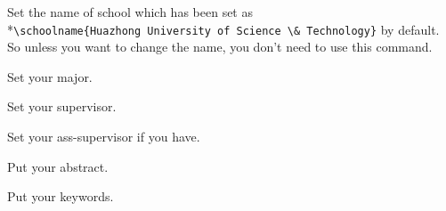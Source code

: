 \documentclass[12pt,a4paper,numbered,full]{l3doc}
\begin{document}
\begin{function}{\schoolname}
    \begin{syntax}
    \end{syntax}
    Set the name of school which has been set as \\*\hbox{\verb+\schoolname{Huazhong University of Science \& Technology}+} by default. So unless you want to change the name, you don't need to use this command.
\end{function}


\begin{function}{\major}
    \begin{syntax}
    \end{syntax}
    Set your major.
\end{function}

\begin{function}{\supervisor}
    \begin{syntax}
    \end{syntax}
    Set your supervisor.
\end{function}

\begin{function}{\asssupervisor}
    \begin{syntax}
    \end{syntax}
    Set your ass-supervisor if you have.
\end{function}

\begin{function}{\abstract}
    \begin{syntax}
    \end{syntax}
    Put your abstract.
\end{function}

\begin{function}{\keywords}
    \begin{syntax}
    \end{syntax}
    Put your keywords.
\end{function}
\end{document}
